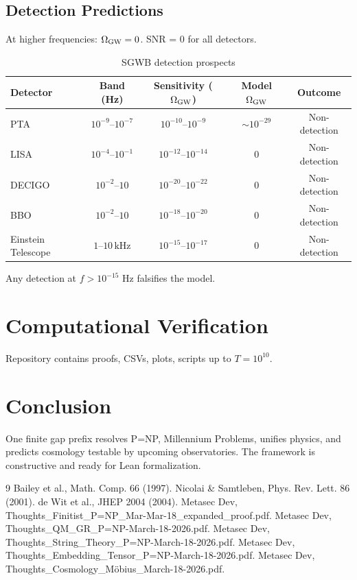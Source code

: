 \documentclass[11pt]{article}
\begin{document}
\subsection{Detection Predictions}
At higher frequencies: $\Omega_{\rm GW} = 0$. SNR = 0 for all detectors.

\begin{table}[h]
\centering
\caption{SGWB detection prospects}
\begin{tabular}{lcccc}
\toprule
Detector & Band (Hz) & Sensitivity ($\Omega_{\rm GW}$) & Model $\Omega_{\rm GW}$ & Outcome \\
\midrule
PTA & $10^{-9}$--$10^{-7}$ & $10^{-10}$--$10^{-9}$ & $\sim 10^{-29}$ & Non-detection \\
LISA & $10^{-4}$--$10^{-1}$ & $10^{-12}$--$10^{-14}$ & 0 & Non-detection \\
DECIGO & $10^{-2}$--$10$ & $10^{-20}$--$10^{-22}$ & 0 & Non-detection \\
BBO & $10^{-2}$--$10$ & $10^{-18}$--$10^{-20}$ & 0 & Non-detection \\
Einstein Telescope & $1$--$10\,\text{kHz}$ & $10^{-15}$--$10^{-17}$ & 0 & Non-detection \\
\bottomrule
\end{tabular}
\end{table}

Any detection at $f > 10^{-15}$ Hz falsifies the model.

\section{Computational Verification}
Repository contains proofs, CSVs, plots, scripts up to $T=10^{10}$.

\section{Conclusion}
One finite gap prefix resolves P=NP, Millennium Problems, unifies physics, and predicts cosmology testable by upcoming observatories. The framework is constructive and ready for Lean formalization.

\begin{thebibliography}{9}
 Bailey et al., Math. Comp. 66 (1997).
 Nicolai \& Samtleben, Phys. Rev. Lett. 86 (2001).
 de Wit et al., JHEP 2004 (2004).
 Metasec Dev, Thoughts\_Finitist\_P=NP\_Mar-Mar-18\_expanded\_proof.pdf.
 Metasec Dev, Thoughts\_QM\_GR\_P=NP-March-18-2026.pdf.
 Metasec Dev, Thoughts\_String\_Theory\_P=NP-March-18-2026.pdf.
 Metasec Dev, Thoughts\_Embedding\_Tensor\_P=NP-March-18-2026.pdf.
 Metasec Dev, Thoughts\_Cosmology\_Möbius\_March-18-2026.pdf.
\end{thebibliography}
\end{document}
